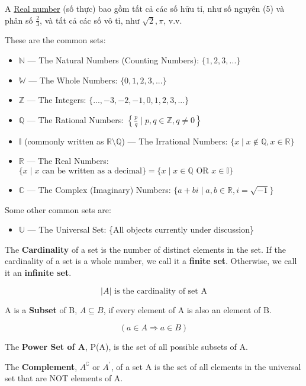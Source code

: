 A \href{https://en.wikipedia.org/wiki/Real_number}{Real number} (số thực) bao gồm tất cả các số hữu tỉ, như số nguyên (5) và phân số \(\frac{2}{3}\), và tất cả các số vô tỉ, như \(\sqrt{2}, \pi\), v.v.

These are the common sets:

\begin{itemize}
  \item $\mathbb{N}$ --- The Natural Numbers (Counting Numbers): $\{1,2,3,...\}$
  \item $\mathbb{W}$ --- The Whole Numbers: $\{0,1,2,3,...\}$
  \item $\mathbb{Z}$ --- The Integers: $\{...,-3,-2,-1,0,1,2,3,...\}$
  \item $\mathbb{Q}$ --- The Rational Numbers: $\left\{ \frac{p}{q} \mid p,q \in \mathbb{Z}, q \neq 0 \right\}$
  \item $\mathbb{I}$ (commonly written as $\mathbb{R} \setminus \mathbb{Q}$) --- The Irrational Numbers: $\{x \mid x \not\in \mathbb{Q}, x \in \mathbb{R}\}$
  \item $\mathbb{R}$ --- The Real Numbers: $\{x \mid x \text{ can be written as a decimal}\} = \{x \mid x \in \mathbb{Q} \text{ OR } x \in \mathbb{I}\}$
  \item $\mathbb{C}$ --- The Complex (Imaginary) Numbers: $\{a+bi \mid a,b \in \mathbb{R} , i=\sqrt{-1}\}$
\end{itemize}

Some other common sets are:

\begin{itemize}
  \item $\mathbb{U}$ --- The Universal Set: \{All objects currently under discussion\}
\end{itemize}

The \textbf{Cardinality} of a set is the number of distinct elements in the set. If the cardinality of a set is a whole number, we call it a \textbf{finite set}. Otherwise, we call it an \textbf{infinite set}.

\[|A| \text{ is the cardinality of set A}\]

A is a \textbf{Subset} of B, $A \subseteq B$, if every element of A is also an element of B.

\[(a\in A \Longrightarrow a\in B)\]

The \textbf{Power Set of A}, P(A), is the set of all possible subsets of A.

The \textbf{Complement}, \(A^\complement \text{ or } A^\prime\), of a set A is the set of all elements in the universal set that are NOT elements of A.

